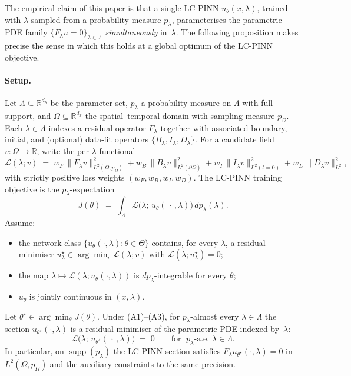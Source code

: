\label{sec:theorem}

The empirical claim of this paper is that a single LC-PINN
$u_\theta(x,\lambda)$, trained with $\lambda$ sampled from a probability
measure $p_\lambda$, parameterises the parametric PDE family
$\{F_\lambda u = 0\}_{\lambda \in \Lambda}$ \emph{simultaneously}
in~$\lambda$. The following proposition makes precise the sense in
which this holds at a global optimum of the LC-PINN objective.

\paragraph{Setup.}
Let $\Lambda \subseteq \mathbb{R}^{d_\lambda}$ be the parameter set,
$p_\lambda$ a probability measure on $\Lambda$ with full support, and
$\Omega \subseteq \mathbb{R}^{d_x}$ the spatial--temporal domain with
sampling measure $p_\Omega$. Each $\lambda \in \Lambda$ indexes a
residual operator $F_\lambda$ together with associated boundary,
initial, and (optional) data-fit operators
$\{B_\lambda, I_\lambda, D_\lambda\}$. For a candidate field
$v: \Omega \to \mathbb{R}$, write the per-$\lambda$ functional
\[
   \mathcal{L}(\lambda; v) \;=\;
     w_F\,\| F_\lambda v \|_{L^2(\Omega, p_\Omega)}^2
   + w_B\,\| B_\lambda v \|_{L^2(\partial\Omega)}^2
   + w_I\,\| I_\lambda v \|_{L^2(t=0)}^2
   + w_D\,\| D_\lambda v \|_{L^2}^2 ,
\]
with strictly positive loss weights $(w_F, w_B, w_I, w_D)$. The
LC-PINN training objective is the $p_\lambda$-expectation
\[
   J(\theta) \;=\;
     \int_{\Lambda} \mathcal{L}\bigl(\lambda;\, u_\theta(\,\cdot\,, \lambda)\bigr)
     \, dp_\lambda(\lambda) .
\]
Assume:
\begin{itemize}\setlength{\itemsep}{0pt}
   \item[(A1)] the network class
         $\{u_\theta(\cdot, \lambda) : \theta \in \Theta\}$ contains,
         for every $\lambda$, a residual-minimiser
         $u^\star_\lambda \in \arg\min_v \mathcal{L}(\lambda; v)$ with
         $\mathcal{L}(\lambda; u^\star_\lambda) = 0$;
   \item[(A2)] the map
         $\lambda \mapsto \mathcal{L}(\lambda; u_\theta(\cdot,\lambda))$
         is $dp_\lambda$-integrable for every $\theta$;
   \item[(A3)] $u_\theta$ is jointly continuous in $(x, \lambda)$.
\end{itemize}

\begin{proposition}
\label{prop:lc-invariance}
Let $\theta^\star \in \arg\min_\theta J(\theta)$. Under
\textnormal{(A1)--(A3)}, for $p_\lambda$-almost every
$\lambda \in \Lambda$ the section
$u_{\theta^\star}(\cdot, \lambda)$ is a residual-minimiser of the
parametric PDE indexed by~$\lambda$:
\[
   \mathcal{L}\bigl(\lambda;\, u_{\theta^\star}(\,\cdot\,, \lambda)\bigr)
   \;=\; 0
   \qquad\text{for }\; p_\lambda\text{-a.e.\ } \lambda \in \Lambda .
\]
In particular, on $\operatorname{supp}(p_\lambda)$ the LC-PINN section
satisfies $F_\lambda u_{\theta^\star}(\cdot,\lambda) = 0$ in
$L^2(\Omega, p_\Omega)$ and the auxiliary constraints to the same
precision.
\end{proposition}

